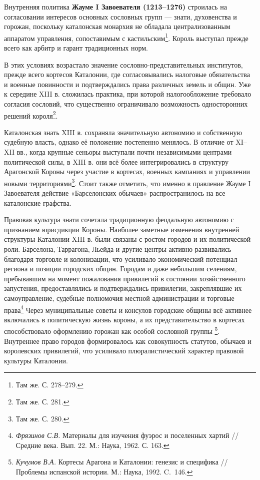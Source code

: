 Внутренняя политика \textbf{Жауме I Завоевателя (1213--1276) }строилась на согласовании интересов основных сословных групп --- знати, духовенства и горожан, поскольку каталонская монархия не обладала централизованным аппаратом управления, сопоставимым с кастильским\footnote{Там же. С. 278--279.}. Король выступал прежде всего как арбитр и гарант традиционных норм.

В этих условиях возрастало значение сословно-представительных институтов, прежде всего кортесов Каталонии, где согласовывались налоговые обязательства и военные повинности и подтверждались права различных земель и общин. Уже к середине XIII в. сложилась практика, при которой налогообложение требовало согласия сословий, что существенно ограничивало возможность односторонних решений короля\footnote{Там же. С. 281.}.

Каталонская знать XIII в. сохраняла значительную автономию и собственную судебную власть, однако её положение постепенно менялось. В отличие от XI--XII вв., когда крупные сеньоры выступали почти независимыми центрами политической силы, в XIII в. они всё более интегрировались в структуру Арагонской Короны через участие в кортесах, военных кампаниях и управлении новыми территориями\footnote{Там же. С. 280.}. Стоит также отметить, что именно в правление Жауме I Завоевателя действие «Барселонских обычаев» распространилось на все каталонские графства.

Правовая культура знати сочетала традиционную феодальную автономию с признанием юрисдикции Короны. Наиболее заметные изменения внутренней структуры Каталонии XIII в. были связаны с ростом городов и их политической роли. Барселона, Таррагона, Льейда и другие центры активно развивались благодаря торговле и колонизации, что усиливало экономический потенциал региона и позиции городских общин. Городам и даже небольшим селениям, пребывавшим на момент пожалования привилегий в состоянии хозяйственного запустения, предоставлялись и подтверждались привилегии, закреплявшие их самоуправление, судебные полномочия местной администрации и торговые права\footnote{\emph{Фрязинов С.В.} Материалы для изучения фуэрос и поселенных хартий // Средние века. Вып. 22. М.: Наука, 1962. С. 163.} Через муниципальные советы и консулов городские общины всё активнее включались в политическую жизнь короны, а их представительство в кортесах способствовало оформлению горожан как особой сословной группы\textsuperscript{ }\footnote{\emph{Кучумов В.А. }Кортесы Арагона и Каталонии: генезис и специфика // Проблемы испанской истории. М.: Наука, 1992. C.~146.}. Внутреннее право городов формировалось как совокупность статутов, обычаев и королевских привилегий, что усиливало плюралистический характер правовой культуры Каталонии.

